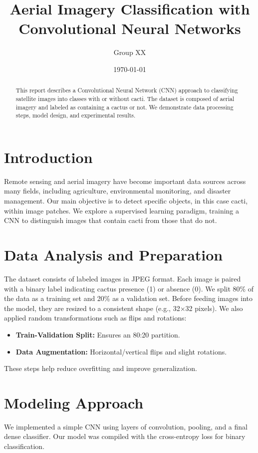 \documentclass[12pt]{article}
\title{Aerial Imagery Classification with Convolutional Neural Networks}
\author{Group XX}
\date{\today}
\begin{document}
\maketitle

\begin{abstract}
This report describes a Convolutional Neural Network (CNN) approach to classifying satellite images 
into classes with or without cacti. The dataset is composed of aerial imagery and labeled as 
containing a cactus or not. We demonstrate data processing steps, model design, and experimental 
results. 
\end{abstract}

\section{Introduction}
Remote sensing and aerial imagery have become important data sources across many fields, including 
agriculture, environmental monitoring, and disaster management. Our main objective is to detect 
specific objects, in this case cacti, within image patches. We explore a supervised learning 
paradigm, training a CNN to distinguish images that contain cacti from those that do not.

\section{Data Analysis and Preparation}
The dataset consists of labeled images in JPEG format. Each image is paired with a binary label 
indicating cactus presence (1) or absence (0). We split 80\% of the data as a training set and 20\% 
as a validation set. Before feeding images into the model, they are resized to a consistent shape 
(e.g., 32$\times$32 pixels). We also applied random transformations such as flips and rotations:
\begin{itemize}
\item \textbf{Train-Validation Split:} Ensures an 80:20 partition.
\item \textbf{Data Augmentation:} Horizontal/vertical flips and slight rotations.
\end{itemize}
These steps help reduce overfitting and improve generalization.

\section{Modeling Approach}
We implemented a simple CNN using layers of convolution, pooling, and a final dense classifier. Our 
model was compiled with the cross-entropy loss for binary classification.
\end{document}
